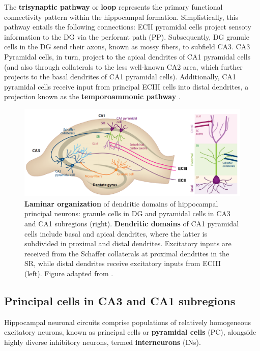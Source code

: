 \documentclass[../main.tex]{subfiles}
\begin{document}
The \textbf{trisynaptic pathway} or \textbf{loop} represents the primary functional connectivity pattern within the hippocampal formation.
Simplistically, this pathway entails the following connections: ECII pyramidal cells project sensoty information to the DG via the perforant path (PP).
Subsequently, DG granule cells in the DG send their axons, known as mossy fibers, to subfield CA3. 
CA3 Pyramidal cells, in turn, project to the apical dendrites of CA1 pyramidal cells (and also through collaterals to the less well-known CA2 area, which further projects to the basal dendrites of CA1 pyramidal cells). 
Additionally, CA1 pyramidal cells receive input from principal ECIII cells into distal dendrites, a projection known as the \textbf{temporoammonic pathway} 
\citep{amaral2007hippocampal,buzsaki_memory_2013,lefebvre_development_2015}.
\begin{figure}[!htb]
    \centering
    \includegraphics[width=\textwidth]{chapter4/figures/hippocampus-structure.png}
    \caption{\textbf{Laminar organization} of dendritic domains of hippocampal principal neurons: granule cells in DG and pyramidal cells in CA3 and CA1 subregions (right). \textbf{Dendritic domains} of CA1 pyramidal cells include basal and apical dendrites, where the latter is subdivided in proximal and distal dendrites. Excitatory inputs are received from the Schaffer collaterals at proximal dendrites in the SR, while distal dendrites receive excitatory inputs from ECIII (left). Figure adapted from \citep{lefebvre_development_2015}.}
    \label{fig:hippocampus_structure}
\end{figure}

\subsection{Principal cells in CA3 and CA1 subregions}
Hippocampal neuronal circuits comprise populations of relatively homogeneous excitatory neurons, known as principal cells or \textbf{pyramidal cells} (PC), alongside highly diverse inhibitory neurons, termed \textbf{interneurons} (INs).
\end{document}
